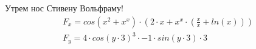 \documentclass{article}
\begin{document}
\par Утрем нос Стивену Вольфраму!
\begin{gather*}
F_{x} = cos\left(x ^ {2} + x ^ {x}\right) \cdot \left(2 \cdot x + x ^ {x} \cdot \left( \frac {x} {x} + ln\left(x\right)\right)\right)\\
F_{y} = 4 \cdot cos\left(y \cdot 3\right) ^ {3} \cdot -1 \cdot sin\left(y \cdot 3\right) \cdot 3\\
\end{gather*}
\end{document}

